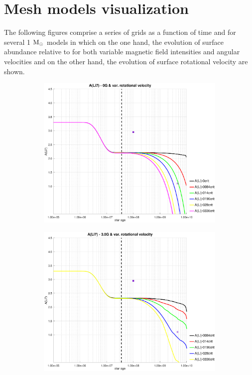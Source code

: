 \documentclass[fleqn,usenatbib]{mnras}
\begin{document}


\appendix

\section{Mesh models visualization}
The following figures comprise a series of grids as a function of time and for several 1 $\mathrm{M}_\odot$ models in which on the one hand, the evolution of surface  abundance relative to  for both variable magnetic field intensities and angular velocities and on the other hand, the evolution of surface rotational velocity are shown.

\begin{figure}
    \centering
    \begin{subfigure}[h]{0.47\textwidth}
    \includegraphics[trim = 35mm 15mm 20mm 15mm, clip,width=\textwidth]{figures/li_var_vel_0_0g.eps}
    \label{fig:subim1}
    \end{subfigure}
    \begin{subfigure}[h]{0.47\textwidth}
    \includegraphics[trim = 35mm 15mm 20mm 15mm, clip,width=\textwidth]{figures/li_var_vel_3_0g.eps}

\end{subfigure}
\end{figure}
\end{document}
